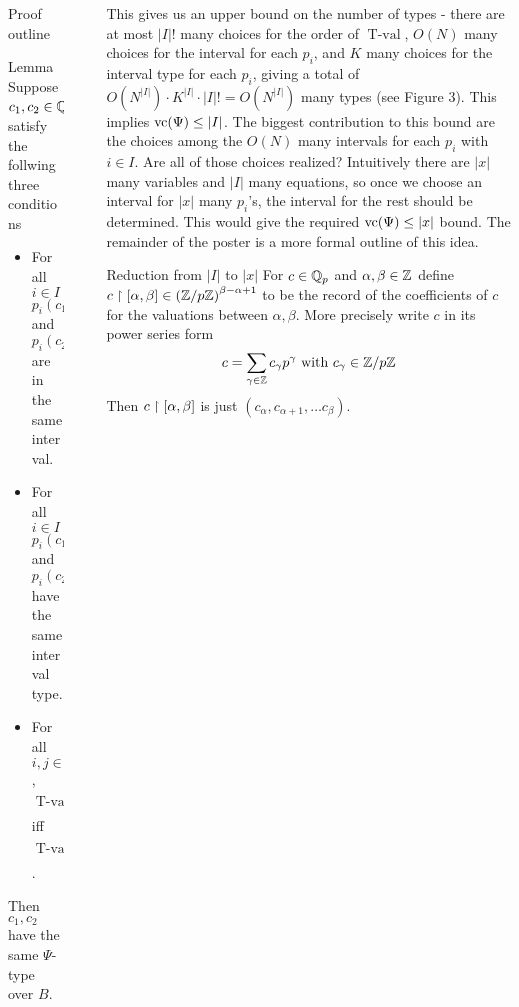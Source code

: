 \documentclass[final]{beamer}
\newcommand{\paren}[1]{\left( #1 \right)}
\DeclareMathOperator{\tval}{T-val}
\newlength{\sepwid}
\newlength{\onecolwid}
\begin{document}
\begin{frame}[t]
\begin{columns}[t]
\begin{column}{\onecolwid}
\begin{block}{Proof outline}
        \begin{alertblock}{Lemma}
                Suppose $c_1, c_2 \in \mathbb{Q}_p^{|x|}$ satisfy the follwing three conditions 
                \begin{itemize}
                    \item For all $i \in I$ $p_i(c_1)$ and $p_i(c_2)$ are in the same interval.
                    \item For all $i \in I$ $p_i(c_1)$ and $p_i(c_2)$ have the same interval type.
                    \item For all $i,j \in I$, $\tval(p_i(c_1)) > \tval(p_j(c_1))$ iff $\tval(p_i(c_2)) > \tval(p_j(c_2))$.
                \end{itemize}
                Then $c_1, c_2$ have the same $\Psi$-type over $B$.
        \end{alertblock}
    \end{block}    
\end{column} %

\begin{column}{\sepwid}\end{column} %

\begin{column}{\onecolwid}

    This gives us an upper bound on the number of types - there are at most $|I|!$ many choices for the order of $\tval$,
    $O(N)$ many choices for the interval for each $p_i$,
    and $K$ many choices for the interval type for each $p_i$,
    giving a total of $O(N^{|I|}) \cdot K^{|I|} \cdot |I|! = O(N^{|I|})$ many types (see Figure 3).
    This implies $\operatorname{vc}(\Psi) \leq |I|$.
    The biggest contribution to this bound are the choices among the $O(N)$ many intervals for each $p_i$ with $i \in I$.
    Are all of those choices realized?
    Intuitively there are $|x|$ many variables and $|I|$ many equations,
    so once we choose an interval for $|x|$ many $p_i$'s, the interval for the rest should be determined.
    This would give the required $\operatorname{vc}(\Psi) \leq |x|$ bound.
    The remainder of the poster is a more formal outline of this idea.

    \begin{block}{Reduction from $|I|$ to $|x|$}
        For $c \in \mathbb{Q}_p$ and $\alpha, \beta \in \mathbb{Z}$ define $c \midr [\alpha, \beta] \in \paren{\Z/p\Z}^{\beta - \alpha + 1}$
        to be the record of the coefficients of $c$ for the valuations between $\alpha, \beta$.
	More precisely write $c$ in its power series form
	\begin{align*}
		c = \sum_{\gamma \in \mathbb{Z}} c_\gamma p^\gamma \text{ with } c_\gamma \in \mathbb{Z}/p\mathbb{Z}
	\end{align*}
	Then $c \upharpoonright [\alpha, \beta]$ is just $(c_\alpha, c_{\alpha+1}, \ldots c_\beta)$.
        

\end{block}
\end{column}
\end{columns}
\end{frame}
\end{document}
